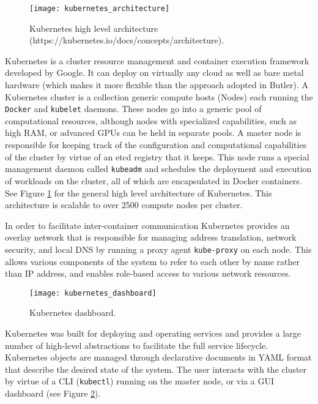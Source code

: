 \begin{figure}[H]
    \texttt{[image: kubernetes\_architecture]}
    \centering
    \caption {Kubernetes high level architecture (https://kubernetes.io/docs/concepts/architecture).}
    \label{fig:kubernetes_architecture}
\end{figure}

Kubernetes is a cluster resource management and container execution framework developed by Google. It can deploy on virtually any cloud as well as bare metal hardware (which makes it more flexible than the approach adopted in Butler). A Kubernetes cluster is a collection generic compute hosts (Nodes) each running the \texttt{Docker} and \texttt{kubelet} daemons. These nodes go into a generic pool of computational resources, although nodes with specialized capabilities, such as high RAM, or advanced GPUs can be held in separate pools. A master node is responsible for keeping track of the configuration and computational capabilities of the cluster by virtue of an etcd registry that it keeps. This node runs a special management daemon called \texttt{kubeadm} and schedules the deployment and execution of workloads on the cluster, all of which are encapsulated in Docker containers. See Figure \ref{fig:kubernetes_architecture} for the general high level architecture of Kubernetes. This architecture is scalable to over 2500 compute nodes per cluster\autocite{scalingkubernetes}.

In order to facilitate inter-container communication Kubernetes provides an overlay network that is responsible for managing address translation, network security, and local DNS by running a proxy agent \texttt{kube-proxy} on each node. This allows various components of the system to refer to each other by name rather than IP address, and enables role-based access to various network resources.

\begin{figure}[h]
    \texttt{[image: kubernetes\_dashboard]}
    \centering
    \caption {Kubernetes dashboard.}
    \label{fig:kubernetes_dashboard}
\end{figure}

Kubernetes was built for deploying and operating services and provides a large number of high-level abstractions to facilitate the full service lifecycle. Kubernetes objects are managed through declarative documents in YAML format that describe the desired state of the system. The user interacts with the cluster by virtue of a CLI (\texttt{kubectl}) running on the master node, or via a GUI dashboard (see Figure \ref{fig:kubernetes_dashboard}).

